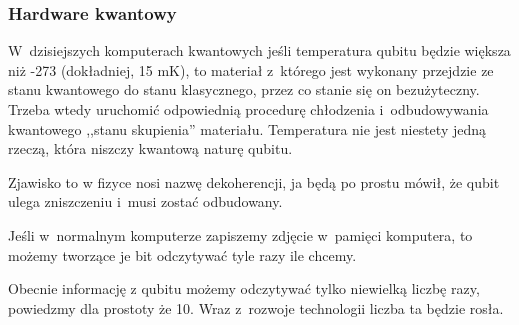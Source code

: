 \documentclass[10pt,t]{beamer}
\begin{document}
\begin{frame}
  \frametitle{Hardware kwantowy}


  W~dzisiejszych komputerach kwantowych jeśli temperatura qubitu
  będzie większa niż -273\textcelsius{ } (dokładniej, 15 mK), to
  materiał z~którego jest wykonany przejdzie ze stanu kwantowego do
  stanu klasycznego, przez co stanie się on bezużyteczny. Trzeba wtedy
  uruchomić odpowiednią procedurę chłodzenia i~odbudowywania
  kwantowego ,,stanu skupienia'' materiału. Temperatura nie jest
  niestety jedną rzeczą, która niszczy kwantową naturę qubitu.

  Zjawisko to w fizyce nosi nazwę dekoherencji, ja będą po prostu
  mówił, że qubit ulega zniszczeniu i~musi zostać odbudowany.

  Jeśli w~normalnym komputerze zapiszemy zdjęcie w~pamięci komputera,
  to możemy tworzące je bit odczytywać tyle razy ile chcemy.

  Obecnie informację z qubitu możemy odczytywać tylko niewielką liczbę
  razy, powiedzmy dla prostoty że 10. Wraz z~rozwoje technologii
  liczba ta będzie rosła.

\end{frame}










\end{document}
